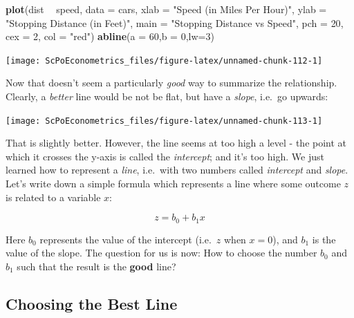 \documentclass[]{book}
\newenvironment{Shaded}{\begin{snugshade}}{\end{snugshade}}
\newcommand{\DataTypeTok}[1]{\textcolor[rgb]{0.13,0.29,0.53}{#1}}
\newcommand{\DecValTok}[1]{\textcolor[rgb]{0.00,0.00,0.81}{#1}}
\newcommand{\KeywordTok}[1]{\textcolor[rgb]{0.13,0.29,0.53}{\textbf{#1}}}
\newcommand{\NormalTok}[1]{#1}
\newcommand{\OperatorTok}[1]{\textcolor[rgb]{0.81,0.36,0.00}{\textbf{#1}}}
\newcommand{\StringTok}[1]{\textcolor[rgb]{0.31,0.60,0.02}{#1}}
\begin{document}
\begin{Shaded}
\begin{Highlighting}[]
\KeywordTok{plot}\NormalTok{(dist }\OperatorTok{~}\StringTok{ }\NormalTok{speed, }\DataTypeTok{data =}\NormalTok{ cars,}
     \DataTypeTok{xlab =} \StringTok{"Speed (in Miles Per Hour)"}\NormalTok{,}
     \DataTypeTok{ylab =} \StringTok{"Stopping Distance (in Feet)"}\NormalTok{,}
     \DataTypeTok{main =} \StringTok{"Stopping Distance vs Speed"}\NormalTok{,}
     \DataTypeTok{pch  =} \DecValTok{20}\NormalTok{,}
     \DataTypeTok{cex  =} \DecValTok{2}\NormalTok{,}
     \DataTypeTok{col  =} \StringTok{"red"}\NormalTok{)}
\KeywordTok{abline}\NormalTok{(}\DataTypeTok{a =} \DecValTok{60}\NormalTok{,}\DataTypeTok{b =} \DecValTok{0}\NormalTok{,}\DataTypeTok{lw=}\DecValTok{3}\NormalTok{)}
\end{Highlighting}
\end{Shaded}

\begin{center}\texttt{[image: ScPoEconometrics\_files/figure-latex/unnamed-chunk-112-1]} \end{center}

Now that doesn't seem a particularly \emph{good} way to summarize the relationship. Clearly, a \emph{better} line would be not be flat, but have a \emph{slope}, i.e.~go upwards:

\begin{center}\texttt{[image: ScPoEconometrics\_files/figure-latex/unnamed-chunk-113-1]} \end{center}

That is slightly better. However, the line seems at too high a level - the point at which it crosses the y-axis is called the \emph{intercept}; and it's too high. We just learned how to represent a \emph{line}, i.e.~with two numbers called \emph{intercept} and \emph{slope}. Let's write down a simple formula which represents a line where some outcome \(z\) is related to a variable \(x\):

\begin{equation}
z = b_0 + b_1 x \label{eq:bline}
\end{equation}

Here \(b_0\) represents the value of the intercept (i.e.~\(z\) when \(x=0\)), and \(b_1\) is the value of the slope. The question for us is now: How to choose the number \(b_0\) and \(b_1\) such that the result is the \textbf{good} line?

\hypertarget{choosing-the-best-line}{%
\subsection{Choosing the Best Line}\label{choosing-the-best-line}}
\end{document}
